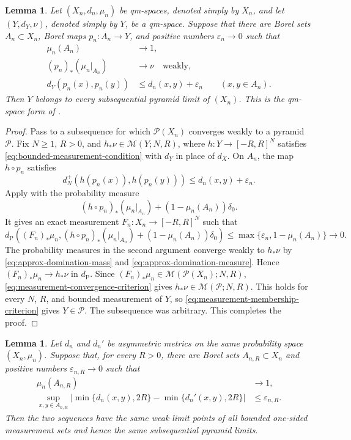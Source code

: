 \documentclass[10pt,a4paper]{amsart}
\numberwithin{equation}{section}
\newtheorem{lemma}[theorem]{Lemma}
\newcommand{\Pyr}{\mathcal P}
\newcommand{\eps}{\varepsilon}
\begin{document}
\begin{lemma}\label{lem:high-mass-domination}
Let $(X_n,d_n,\mu_n)$ be qm-spaces, denoted simply by $X_n$, and let $(Y,d_Y,\nu)$, denoted simply by $Y$, be a qm-space.  Suppose that there are Borel sets $A_n\subset X_n$, Borel maps $p_n\colon A_n\to Y$, and positive numbers $\eps_n\to0$ such that
\begin{align}
\mu_n(A_n)&\longrightarrow1, \label{eq:approx-domination-mass}\\
(p_n)_*(\mu_n|_{A_n})&\longrightarrow\nu \quad\text{weakly}, \label{eq:approx-domination-measure}\\
d_Y(p_n(x),p_n(y))&\le d_n(x,y)+\eps_n \qquad(x,y\in A_n). \label{eq:approx-domination-distance}
\end{align}
Then $Y$ belongs to every subsequential pyramid limit of $(X_n)$.
This is the qm-space form of \cite[Proposition~3.11]{one-sided-pyramids}.
\end{lemma}

\begin{proof}
Pass to a subsequence for which $\Pyr(X_n)$ converges weakly to a pyramid $\mathcal P$.  Fix $N\ge1$, $R>0$, and $h_*\nu\in\mathcal M(Y;N,R)$, where $h\colon Y\to[-R,R]^N$ satisfies \eqref{eq:bounded-measurement-condition} with $d_Y$ in place of $d_X$.  On $A_n$, the map $h\circ p_n$ satisfies
\[ d_N^+(h(p_n(x)),h(p_n(y)))\le d_n(x,y)+\eps_n. \]
Apply  with the probability measure
\[ (h\circ p_n)_*(\mu_n|_{A_n})+(1-\mu_n(A_n))\delta_0. \]
It gives an exact measurement $F_n\colon X_n\to[-R,R]^N$ such that
\[ d_{\mathrm P}\left((F_n)_*\mu_n,(h\circ p_n)_*(\mu_n|_{A_n})+(1-\mu_n(A_n))\delta_0\right) \le\max\{\eps_n,1-\mu_n(A_n)\}\longrightarrow0. \]
The probability measures in the second argument converge weakly to $h_*\nu$ by \eqref{eq:approx-domination-mass} and \eqref{eq:approx-domination-measure}.  Hence $(F_n)_*\mu_n\to h_*\nu$ in $d_{\mathrm P}$.  Since $(F_n)_*\mu_n\in\mathcal M(\Pyr(X_n);N,R)$, \eqref{eq:measurement-convergence-criterion} gives $h_*\nu\in\mathcal M(\mathcal P;N,R)$.  This holds for every $N$, $R$, and bounded measurement of $Y$, so \eqref{eq:measurement-membership-criterion} gives $Y\in\mathcal P$.  The subsequence was arbitrary.
This completes the proof.
\end{proof}

\begin{lemma}\label{lem:bounded-kernel-transfer}
Let $d_n$ and $d_n'$ be asymmetric metrics on the same probability space $(X_n,\mu_n)$.  Suppose that, for every $R>0$, there are Borel sets $A_{n,R}\subset X_n$ and positive numbers $\eps_{n,R}\to0$ such that
\begin{align}
\mu_n(A_{n,R})&\longrightarrow1, \label{eq:bounded-kernel-mass}\\
 \sup_{x,y\in A_{n,R}}
 \left|\min\{d_n(x,y),2R\}-\min\{d_n'(x,y),2R\}\right|
 &\le\eps_{n,R}.
 \label{eq:bounded-kernel-comparison}
\end{align}
Then the two sequences have the same weak limit points of all bounded one-sided measurement sets and hence the same subsequential pyramid limits.
\end{lemma}
\end{document}
